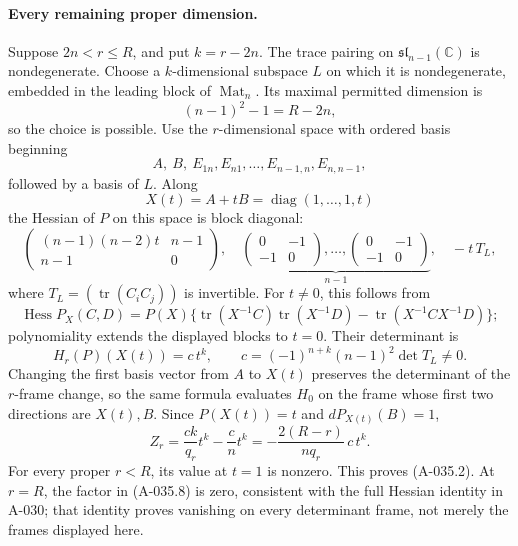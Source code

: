 \paragraph{Every remaining proper dimension.}
Suppose \(2n<r\leq R\), and put \(k=r-2n\).
The trace pairing on
\(\mathfrak{sl}_{n-1}(\mathbb C)\) is nondegenerate.
Choose a \(k\)-dimensional subspace \(L\) on which
it is nondegenerate, embedded in the leading block
of \(\operatorname{Mat}_n\).
Its maximal permitted dimension is
\[
            (n-1)^2-1=R-2n,
\]
so the choice is possible. Use the \(r\)-dimensional
space with ordered basis beginning
\[
        A,\ B,\ E_{1n},E_{n1},\ldots,E_{n-1,n},E_{n,n-1},
\]
followed by a basis of \(L\). Along
\[
                  X(t)=A+tB=\operatorname{diag}(1,\ldots,1,t)
\]
the Hessian of \(P\) on this space is block diagonal:
\[
 \begin{pmatrix}(n-1)(n-2)t&n-1\\n-1&0\end{pmatrix},
 \quad
 \underbrace{\begin{pmatrix}0&-1\\-1&0\end{pmatrix},
       \ldots,\begin{pmatrix}0&-1\\-1&0\end{pmatrix}}_{n-1},
 \quad -t\,T_L,
                                                               \tag{A-035.6}
\]
where \(T_L=(\operatorname{tr}(C_iC_j))\) is invertible.
For \(t\ne0\), this follows from
\[
 \operatorname{Hess}P_X(C,D)
 =P(X)\{\operatorname{tr}(X^{-1}C)\operatorname{tr}(X^{-1}D)
                    -\operatorname{tr}(X^{-1}CX^{-1}D)\};
\]
polynomiality extends the displayed blocks to \(t=0\).
Their determinant is
\[
                H_r(P)(X(t))=c\,t^k,\qquad
                c=(-1)^{n+k}(n-1)^2\det T_L\ne0.              \tag{A-035.7}
\]
Changing the first basis vector from \(A\) to \(X(t)\)
preserves the determinant of the \(r\)-frame change,
so the same formula evaluates \(H_0\) on the frame
whose first two directions are \(X(t),B\).
Since \(P(X(t))=t\) and \(dP_{X(t)}(B)=1\),
\[
 Z_r=\frac{c k}{q_r}t^k-\frac c n t^k
     =-\frac{2(R-r)}{nq_r}\,c\,t^k.                           \tag{A-035.8}
\]
For every proper \(r<R\), its value at \(t=1\)
is nonzero. This proves (A-035.2).
At \(r=R\), the factor in (A-035.8) is zero,
consistent with the full Hessian identity in A-030;
that identity proves vanishing on every determinant
frame, not merely the frames displayed here.

